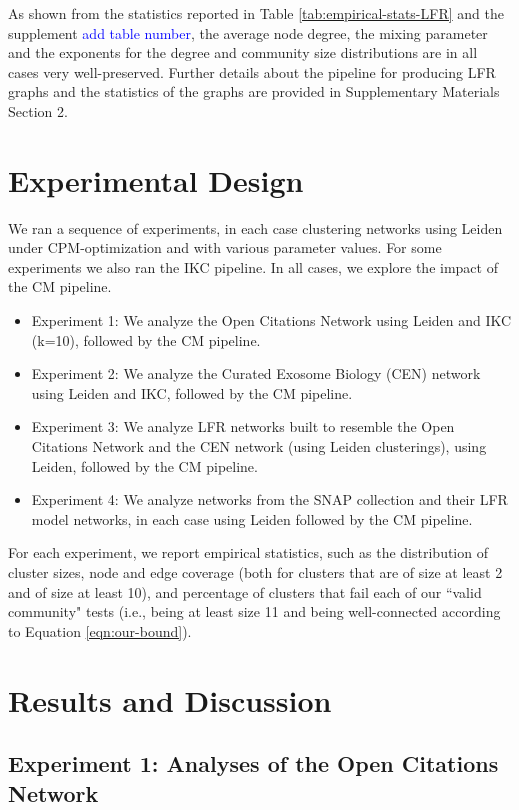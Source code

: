 \documentclass[11pt]{article}   	%
\begin{document}
As shown from the statistics reported in Table \ref{tab:empirical-stats-LFR} and the supplement \textcolor{blue}{add table number}, the average node degree, the mixing parameter and the exponents for the degree and community size distributions are in all cases very well-preserved. Further details about the pipeline for producing LFR graphs and the statistics of the graphs are provided in Supplementary Materials Section 2.

\section{Experimental Design}
\label{sec:expt-design}
We ran a sequence of experiments, in each case clustering networks using Leiden under CPM-optimization and with various parameter values. For some experiments we also ran the IKC pipeline.  In all cases, we explore the impact of the CM pipeline.
\begin{itemize}
\item Experiment 1: We analyze the Open Citations Network using Leiden  and IKC (k=10), followed by the CM pipeline.
\item Experiment 2: We analyze the Curated Exosome Biology (CEN) network using Leiden and IKC, followed by the CM pipeline.
\item Experiment 3: We analyze LFR networks built to resemble the Open Citations Network and the CEN network (using Leiden clusterings), using Leiden, followed by the CM pipeline.
\item Experiment 4: We analyze networks from the SNAP collection and their LFR model networks, in each case using Leiden followed by the CM pipeline.
\end{itemize}

For each experiment, we report empirical statistics, such as the distribution of cluster sizes, node and edge coverage (both for clusters that are of size at least 2 and of size at least 10), and percentage of clusters that fail each of our ``valid community" tests (i.e., being at least size 11 and being well-connected according to Equation \ref{eqn:our-bound}).

\section{Results and Discussion}
\label{sec:results-discussion}

\subsection{Experiment 1: Analyses of the Open Citations Network}
\end{document}
